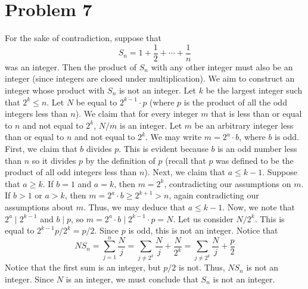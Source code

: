 \documentclass[12pt]{article}
\begin{document}
\section*{Problem 7}
For the sake of contradiction, suppose that 
\[
S_n = 1 + \frac{1}{2} + \cdots + \frac{1}{n}
\]
 was an integer. Then the product of $S_n$ with any other integer must also be an integer (since integers are closed under multiplication). We aim to construct an integer whose product with $S_n$ is not an integer. Let $k$ be the largest integer such that $2^k \leq n$. Let $N$ be equal to $2^{k-1} \cdot p$ (where $p$ is the product of all the odd integers less than $n$). We claim that for every integer $m$ that is less than or equal to $n$ and not equal to $2^{k}$, $N/m$ is an integer. Let $m$ be an arbitrary integer less than or equal to $n$ and not equal to $2^k$. We may write $m = 2^a \cdot b$, where $b$ is odd. First, we claim that $b$ divides $p$. This is evident because $b$ is an odd number less than $n$ so it divides $p$ by the definition of $p$ (recall that $p$ was defined to be the product of all odd integers less than $n$). Next, we claim that $a \leq k-1$. Suppose that $a \geq k$. If $b = 1$ and $a = k$, then $m = 2^k$, contradicting our assumptions on $m$. If $b>1$ or $a > k$, then $m = 2^a \cdot b \geq 2^{k+1} > n$, again contradicting our assumptions about $m$. Thus, we may deduce that $a \leq k - 1$. Now, we note that $2^a \mid 2^{k-1}$ and $b \mid p$, so $m = 2^a \cdot b \mid 2^{k-1} \cdot p = N$. Let us consider $N/2^k$. This is equal to $2^{k-1}p/2^k = p/2$. Since $p$ is odd, this is not an integer. Notice that
 \[
 NS_n = \sum_{j=1}^n \frac{N}{j} = \sum_{j\neq 2^k} \frac{N}{j} + \frac{N}{2^k} = \sum_{j\neq 2^k} \frac{N}{j} + \frac{p}{2}
 \] Notice that the first sum is an integer, but $p/2$ is not. Thus, $NS_n$ is not an integer. Since $N$ is an integer, we must conclude that $S_n$ is not an integer.
 
\end{document}
